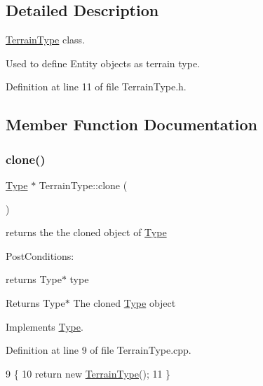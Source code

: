 \subsection{Detailed Description}
\hyperlink{classTerrainType}{Terrain\+Type} class. 

Used to define Entity objects as terrain type. 

Definition at line 11 of file Terrain\+Type.\+h.



\subsection{Member Function Documentation}
\mbox{\label{classTerrainType_aa2c54fdc07981dab3941f28221e22655}} 
\subsubsection{\texorpdfstring{clone()}{clone()}}
{\footnotesize\ttfamily \hyperlink{classType}{Type} $\ast$ Terrain\+Type\+::clone (\begin{DoxyParamCaption}{ }\end{DoxyParamCaption})\hspace{0.3cm}{\ttfamily [virtual]}}



returns the the cloned object of \hyperlink{classType}{Type} 

Post\+Conditions\+:
\begin{DoxyItemize}
\item returns Type$\ast$ type
\end{DoxyItemize}

\begin{DoxyReturn}{Returns}
Type$\ast$ The cloned \hyperlink{classType}{Type} object 
\end{DoxyReturn}


Implements \hyperlink{classType_a7b79d264e2cbac9c091cdb41ffb112c9}{Type}.



Definition at line 9 of file Terrain\+Type.\+cpp.


\begin{DoxyCode}
9                          \{
10     \textcolor{keywordflow}{return} \textcolor{keyword}{new} \hyperlink{classTerrainType_aea114fb5e125b58bf9d9c9ab964749c7}{TerrainType}();
11 \}
\end{DoxyCode}
\mbox{\label{classTerrainType_af24f4291676b6862c90b0d29598fcb11}} 
